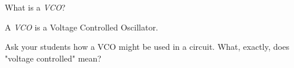 

What is a {\it VCO}?







A {\it VCO} is a Voltage Controlled Oscillator.







Ask your students how a VCO might be used in a circuit.  What, exactly, does "voltage controlled" mean?




